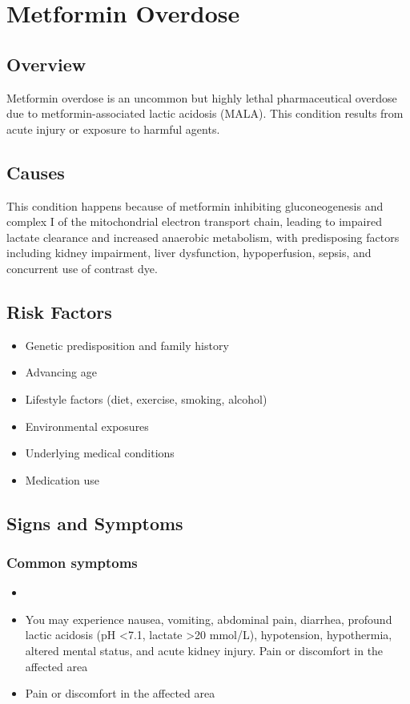 \chapter{Metformin Overdose}
\label{sec:Metformin Overdose}

\section{Overview}
Metformin overdose is an uncommon but highly lethal pharmaceutical overdose due to metformin-associated lactic acidosis (MALA). This condition results from acute injury or exposure to harmful agents.
\section{Causes}
This condition happens because of metformin inhibiting gluconeogenesis and complex I of the mitochondrial electron transport chain, leading to impaired lactate clearance and increased anaerobic metabolism, with predisposing factors including kidney impairment, liver dysfunction, hypoperfusion, sepsis, and concurrent use of contrast dye.     
\section{Risk Factors}

\begin{itemize}[noitemsep]
  \item Genetic predisposition and family history
  \item Advancing age
  \item Lifestyle factors (diet, exercise, smoking, alcohol)
  \item Environmental exposures
  \item Underlying medical conditions
  \item Medication use
\end{itemize}
\section{Signs and Symptoms}

\subsection{Common symptoms}
\begin{itemize}[noitemsep]
  \item \item You may experience nausea, vomiting, abdominal pain, diarrhea, profound lactic acidosis (pH <7.1, lactate >20 mmol/L), hypotension, hypothermia, altered mental status, and acute kidney injury. Pain or discomfort in the affected area    \item Pain or discomfort in the affected area
  \end{itemize}

